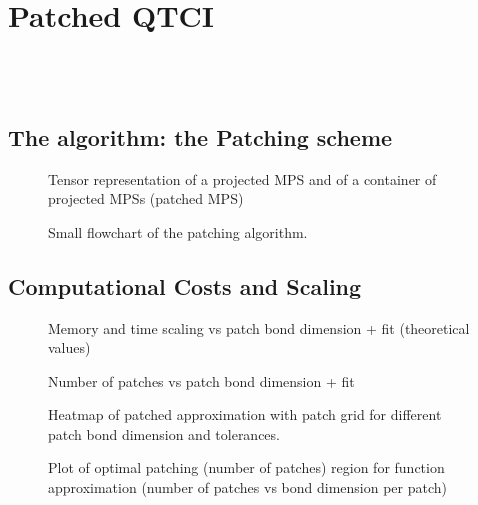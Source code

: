 \chapter{Patched QTCI}
\label{chap:patching}

\\

\noindent {}\\ 

\section{The algorithm: the Patching scheme}

\begin{figure}[ht!]
	\caption{Tensor representation of a projected MPS and of a container of projected MPSs (patched MPS)}
\end{figure}

\begin{figure}[ht!]
	\caption{Small flowchart of the patching algorithm.}
\end{figure}
\section{Computational Costs and Scaling}

\begin{figure}[ht!]
	\caption{Memory and time scaling vs patch bond dimension + fit (theoretical values)}
\end{figure}

\begin{figure}[ht!]
	\caption{Number of patches vs patch bond dimension + fit }
\end{figure}

\begin{figure}[ht!]
	\caption{Heatmap of patched approximation with patch grid for different patch bond dimension and tolerances.}
\end{figure}

\begin{figure}[ht!]
	\caption{Plot of optimal patching (number of patches) region for function approximation (number of patches vs bond dimension per patch)}
\end{figure}



